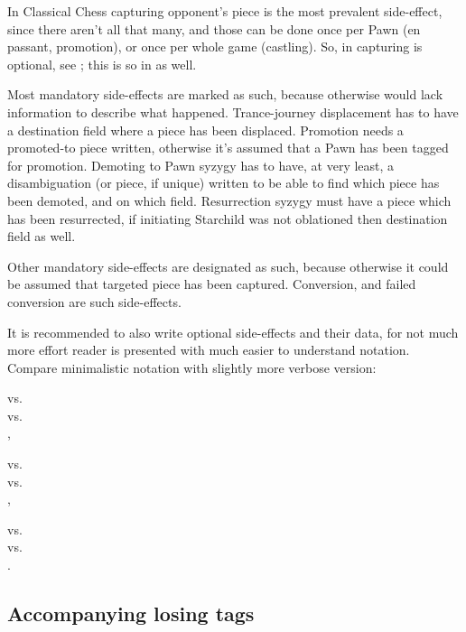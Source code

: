 In Classical Chess capturing opponent's piece is the most prevalent side-effect, since there aren't
all that many, and those can be done once per Pawn (en passant, promotion), or once per whole game
(castling). So, in  capturing is optional, see ; this is so in
 as well.

Most mandatory side-effects are marked as such, because otherwise  would lack information
to describe what happened. Trance-journey displacement has to have a destination field where a piece
has been displaced. Promotion needs a promoted-to piece written, otherwise it's assumed that a Pawn
has been tagged for promotion. Demoting to Pawn syzygy has to have, at very least, a disambiguation
(or piece, if unique) written to be able to find which piece has been demoted, and on which field.
Resurrection syzygy must have a piece which has been resurrected, if initiating Starchild was not
oblationed then destination field as well.

Other mandatory side-effects are designated as such, because otherwise it could be assumed that
targeted piece has been captured. Conversion, and failed conversion are such side-effects.

It is recommended to also write optional side-effects and their data, for not much more effort
reader is presented with much easier to understand notation. Compare minimalistic notation with
slightly more verbose version:

\noindent
{} vs. \\
 vs. \\
,

\noindent
{} vs. \\
 vs. \\
,

\noindent
{} vs. \\
 vs. \\
.

\subsection*{Accompanying losing tags}
\label{sec:Appendix/Summary/Accompanying-losing-tags}

